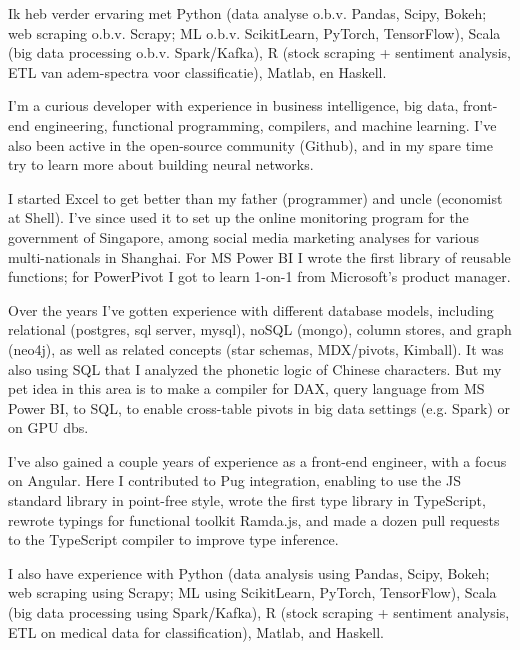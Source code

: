 


Ik heb verder ervaring met Python (data analyse o.b.v. Pandas, Scipy, Bokeh; web scraping o.b.v. Scrapy; ML o.b.v. ScikitLearn, PyTorch, TensorFlow), Scala (big data processing o.b.v. Spark/Kafka), R (stock scraping + sentiment analysis, ETL van adem-spectra voor classificatie), Matlab, en Haskell.


I'm a curious developer with experience in business intelligence, big data, front-end engineering, functional programming, compilers, and machine learning. I've also been active in the open-source community (Github), and in my spare time try to learn more about building neural networks.

I started Excel to get better than my father (programmer) and uncle (economist at Shell). I've since used it to set up the online monitoring program for the government of Singapore, among social media marketing analyses for various multi-nationals in Shanghai. For MS Power BI I wrote the first library of reusable functions; for PowerPivot I got to learn 1-on-1 from Microsoft's product manager.

Over the years I've gotten experience with different database models, including relational (postgres, sql server, mysql), noSQL (mongo), column stores, and graph (neo4j), as well as related concepts (star schemas, MDX/pivots, Kimball). It was also using SQL that I analyzed the phonetic logic of Chinese characters. But my pet idea in this area is to make a compiler for DAX, query language from MS Power BI, to SQL, to enable cross-table pivots in big data settings (e.g. Spark) or on GPU dbs.

I've also gained a couple years of experience as a front-end engineer, with a focus on Angular. Here I contributed to Pug integration, enabling to use the JS standard library in point-free style, wrote the first type library in TypeScript, rewrote typings for functional toolkit Ramda.js, and made a dozen pull requests to the TypeScript compiler to improve type inference.

I also have experience with Python (data analysis using Pandas, Scipy, Bokeh; web scraping using Scrapy; ML using ScikitLearn, PyTorch, TensorFlow), Scala (big data processing using Spark/Kafka), R (stock scraping + sentiment analysis, ETL on medical data for classification), Matlab, and Haskell.
